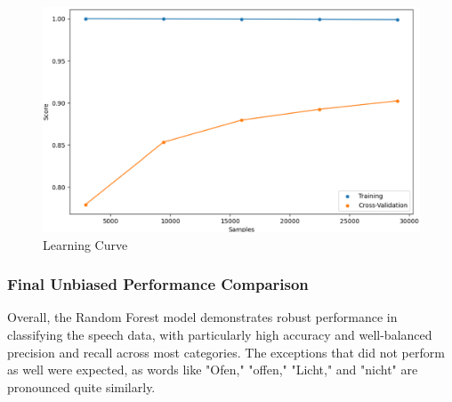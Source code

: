 \begin{figure}[!ht]
    \centering
    \includegraphics[scale=0.5]{fig/rfc_learning_curve.png}
    \vspace{-0.3cm}
    \caption{Learning Curve}
    \label{fig:rfc_learning_curve}
    \vspace{-0.1cm}
\end{figure}

\subsubsection{Final Unbiased Performance Comparison}
Overall, the Random Forest model demonstrates robust performance in classifying the speech data, with particularly high accuracy and well-balanced precision and recall across most categories. The exceptions that did not perform as well were expected, as words like "Ofen," "offen," "Licht," and "nicht" are pronounced quite similarly.

